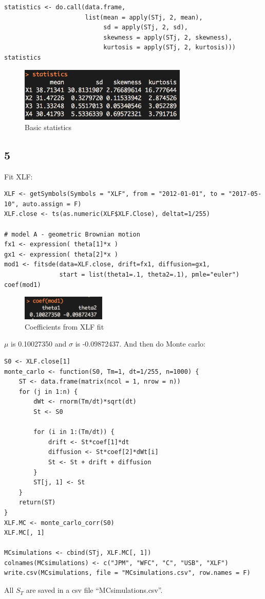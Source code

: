 \documentclass{article}
\begin{document}
\begin{verbatim}
statistics <- do.call(data.frame, 
                      list(mean = apply(STj, 2, mean),
                           sd = apply(STj, 2, sd),
                           skewness = apply(STj, 2, skewness),
                           kurtosis = apply(STj, 2, kurtosis)))
statistics
\end{verbatim}

\begin{figure}[h] 
\begin{center} 
\includegraphics[width = 8cm]{stas.png}  
\caption{Basic statistics} 
\end{center} 
\end{figure}


\subsection{5}
Fit XLF:
\begin{verbatim}
XLF <- getSymbols(Symbols = "XLF", from = "2012-01-01", to = "2017-05-10", auto.assign = F)
XLF.close <- ts(as.numeric(XLF$XLF.Close), deltat=1/255)

# model A - geometric Brownian motion
fx1 <- expression( theta[1]*x )
gx1 <- expression( theta[2]*x )
mod1 <- fitsde(data=XLF.close, drift=fx1, diffusion=gx1,
               start = list(theta1=.1, theta2=.1), pmle="euler")
coef(mod1)
\end{verbatim}

\begin{figure}[h] 
\begin{center} 
\includegraphics[width = 4cm]{coefx.png}  
\caption{Coefficients from XLF fit} 
\end{center} 
\end{figure}

$\mu$ is 0.10027350 and $\sigma$ is -0.09872437. And then do Monte carlo:

\begin{verbatim}
S0 <- XLF.close[1]
monte_carlo <- function(S0, Tm=1, dt=1/255, n=1000) {
    ST <- data.frame(matrix(ncol = 1, nrow = n))
    for (j in 1:n) {
        dWt <- rnorm(Tm/dt)*sqrt(dt)
        St <- S0
        
        for (i in 1:(Tm/dt)) {
            drift <- St*coef[1]*dt
            diffusion <- St*coef[2]*dWt[i]
            St <- St + drift + diffusion
        }
        ST[j, 1] <- St
    }
    return(ST)
}
XLF.MC <- monte_carlo_corr(S0)
XLF.MC[, 1]

MCsimulations <- cbind(STj, XLF.MC[, 1])
colnames(MCsimulations) <- c("JPM", "WFC", "C", "USB", "XLF")
write.csv(MCsimulations, file = "MCsimulations.csv", row.names = F)
\end{verbatim}
All $S_T$ are saved in a csv file ``MCsimulations.csv''.
\end{document}
